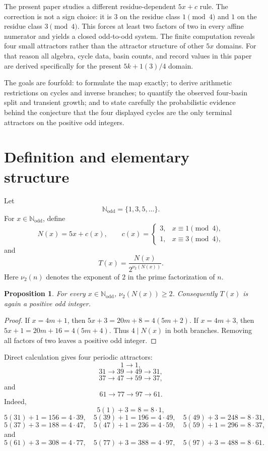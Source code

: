 \documentclass[11pt]{article}
\newtheorem{proposition}{Proposition}
\newcommand{\vTwo}{\nu_2}
\begin{document}
The present paper studies a different residue-dependent $5x+c$ rule. The correction is not a sign choice: it is $3$ on the residue class $1\pmod4$ and $1$ on the residue class $3\pmod4$. This forces at least two factors of two in every affine numerator and yields a closed odd-to-odd system. The finite computation reveals four small attractors rather than the attractor structure of other $5x$ domains. For that reason all algebra, cycle data, basin counts, and record values in this paper are derived specifically for the present $5k+1(3)/4$ domain.

The goals are fourfold: to formulate the map exactly; to derive arithmetic restrictions on cycles and inverse branches; to quantify the observed four-basin split and transient growth; and to state carefully the probabilistic evidence behind the conjecture that the four displayed cycles are the only terminal attractors on the positive odd integers.

\section{Definition and elementary structure}
Let
\[
\mathbb N_{\mathrm{odd}}=\{1,3,5,\ldots\}.
\]
For $x\in\mathbb N_{\mathrm{odd}}$, define
\begin{equation}
N(x)=5x+c(x),\qquad
c(x)=\begin{cases}
3,&x\equiv1\pmod4,\\
1,&x\equiv3\pmod4,
\end{cases}
\end{equation}
and
\begin{equation}
T(x)=\frac{N(x)}{2^{\vTwo(N(x))}}.
\end{equation}
Here $\vTwo(n)$ denotes the exponent of $2$ in the prime factorization of $n$.

\begin{proposition}
For every $x\in\mathbb N_{\mathrm{odd}}$, $\vTwo(N(x))\ge2$. Consequently $T(x)$ is again a positive odd integer.
\end{proposition}
\begin{proof}
If $x=4m+1$, then $5x+3=20m+8=4(5m+2)$. If $x=4m+3$, then $5x+1=20m+16=4(5m+4)$. Thus $4\mid N(x)$ in both branches. Removing all factors of two leaves a positive odd integer.
\end{proof}

Direct calculation gives four periodic attractors:
\[
1\longrightarrow1,
\]
\[
31\longrightarrow39\longrightarrow49\longrightarrow31,
\]
\[
37\longrightarrow47\longrightarrow59\longrightarrow37,
\]
and
\[
61\longrightarrow77\longrightarrow97\longrightarrow61.
\]
Indeed,
\[
5(1)+3=8=8\cdot1,
\]
\[
5(31)+1=156=4\cdot39,\quad 5(39)+1=196=4\cdot49,\quad 5(49)+3=248=8\cdot31,
\]
\[
5(37)+3=188=4\cdot47,\quad 5(47)+1=236=4\cdot59,\quad 5(59)+1=296=8\cdot37,
\]
and
\[
5(61)+3=308=4\cdot77,\quad 5(77)+3=388=4\cdot97,\quad 5(97)+3=488=8\cdot61.
\]
\end{document}
